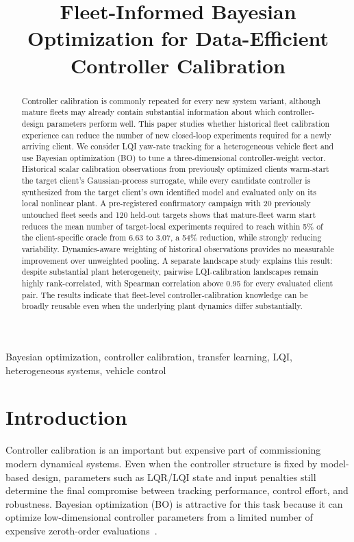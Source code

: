 \documentclass[conference]{IEEEtran}
\title{Fleet-Informed Bayesian Optimization for Data-Efficient Controller Calibration}
\author{\IEEEauthorblockN{Jakob Weber, Markus Gurtner, Adrian Trachte, Andreas Kugi}
\IEEEauthorblockA{\textit{Draft author list -- affiliations to be finalized}}}
\begin{document}
\maketitle

\begin{abstract}
Controller calibration is commonly repeated for every new system variant, although mature fleets may already contain substantial information about which controller-design parameters perform well. This paper studies whether historical fleet calibration experience can reduce the number of new closed-loop experiments required for a newly arriving client. We consider LQI yaw-rate tracking for a heterogeneous vehicle fleet and use Bayesian optimization (BO) to tune a three-dimensional controller-weight vector. Historical scalar calibration observations from previously optimized clients warm-start the target client's Gaussian-process surrogate, while every candidate controller is synthesized from the target client's own identified model and evaluated only on its local nonlinear plant. A pre-registered confirmatory campaign with 20 previously untouched fleet seeds and 120 held-out targets shows that mature-fleet warm start reduces the mean number of target-local experiments required to reach within 5\% of the client-specific oracle from 6.63 to 3.07, a 54\% reduction, while strongly reducing variability. Dynamics-aware weighting of historical observations provides no measurable improvement over unweighted pooling. A separate landscape study explains this result: despite substantial plant heterogeneity, pairwise LQI-calibration landscapes remain highly rank-correlated, with Spearman correlation above 0.95 for every evaluated client pair. The results indicate that fleet-level controller-calibration knowledge can be broadly reusable even when the underlying plant dynamics differ substantially.
\end{abstract}

\begin{IEEEkeywords}
Bayesian optimization, controller calibration, transfer learning, LQI, heterogeneous systems, vehicle control
\end{IEEEkeywords}

\section{Introduction}
Controller calibration is an important but expensive part of commissioning modern dynamical systems. Even when the controller structure is fixed by model-based design, parameters such as LQR/LQI state and input penalties still determine the final compromise between tracking performance, control effort, and robustness. Bayesian optimization (BO) is attractive for this task because it can optimize low-dimensional controller parameters from a limited number of expensive zeroth-order evaluations~\cite{frazier2018tutorial,marco2016lqr,berkenkamp2016safe,schillinger2017safe,vonrohr2024local}.
\end{document}
